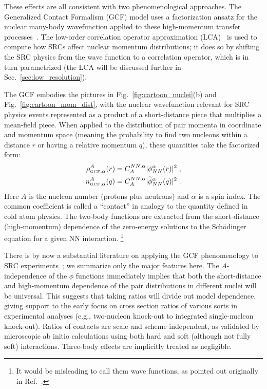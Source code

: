 \documentclass[10pt,aps,prc,floatfix,twocolumn,nofootinbib]{revtex4-1}
\begin{document}
These effects are all consistent with two phenomenological approaches. 
The Generalized Contact Formalism (GCF) model uses a factorization ansatz for the nuclear many-body wavefunction applied to these high-momentum transfer processes~\cite{Weiss:2015mba,Weiss:2016obx,Weiss:2018tbu,Weiss:2021zyb}. 
The low-order correlation operator approximation (LCA)~\cite{Vanhalst:2014cqa,Ryckebusch:2018rct,Ryckebusch:2019oya} is used to compute how SRCs affect nuclear momentum distributions; it does so by shifting the SRC physics from the wave function to a correlation operator, which is in turn parametrized
(the LCA will be discussed further in Sec.~\ref{sec:low_resolution}).

The GCF embodies the pictures in Fig.~\ref{fig:cartoon_nuclei}(b) and Fig.~\ref{fig:cartoon_mom_dist}, with the nuclear wavefunction relevant for SRC physics events represented as a product of a short-distance piece that multiplies a mean-field piece.
When applied to the distribution of pair momenta in coordinate and momentum space (meaning the probability to find two nucleons within a distance $r$ or having a relative momentum $q$), these quantities take the factorized form:
%
\begin{align}
     \rho^A_{{\rm\scriptscriptstyle GCF},\alpha}(r)  &= C_{A}^{NN,\alpha} |\phi^\alpha_{NN}(r)|^2 \;,
     \label{eq:GCF_coordinate}
    \\
    n^A_{{\rm\scriptscriptstyle GCF},\alpha}(q) &= C_{A}^{NN,\alpha} |\widetilde \phi^\alpha_{NN}(q)|^2
    \;. \label{eq:GCF_momentum}
\end{align}
%
Here $A$ is the nucleon number (protons plus neutrons) and $\alpha$ is a spin index.
The common coefficient is called a ``contact'' in analogy to the quantity defined in cold atom physics.
The two-body functions are extracted from the short-distance (high-momentum) dependence of the zero-energy solutions to the Sch\"odinger equation for a given NN interaction.%
\footnote{It would be misleading to call them wave functions, as pointed out originally in Ref.~\cite{Brueckner:1955zzd}.}

There is by now a substantial literature on applying the GCF phenomenology to SRC experiments~\cite{Weiss:2015mba,Weiss:2016obx,Weiss:2018tbu,Cruz-Torres:2019fum,Weiss:2021zyb,Pybus:2020itv,Schmidt:2020kcl}; we summarize only the major features here.
The $A$-independence of the $\phi$ functions immediately implies that both the short-distance and high-momentum dependence of the pair distributions in different nuclei will be universal.
This suggests that taking ratios will divide out model dependence, giving support to the early focus on cross section ratios of various sorts in experimental analyses (e.g., two-nucleon knock-out to integrated single-nucleon knock-out).
Ratios of contacts are scale and scheme independent, as validated by microscopic ab initio calculations using both hard and soft (although not fully soft) interactions.
Three-body effects are implicitly treated as negligible.
\end{document}
